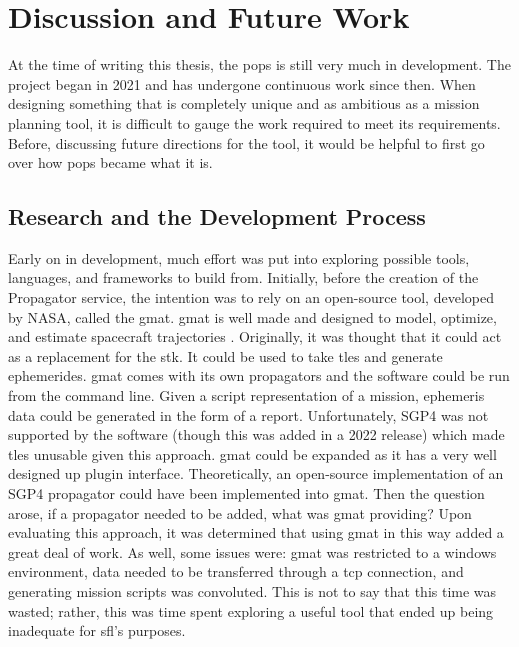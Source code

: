 \glsresetall{} 

\chapter{Discussion and Future Work}\label{chap:discussion}

\lettrine[lines=2, findent=0pt, nindent=5pt]{A}{}t the time of writing this
thesis, the \gls{pops} is still very much in development. The project began in
2021 and has undergone continuous work since then. When designing something that
is completely unique and as ambitious as a mission planning tool, it is
difficult to gauge the work required to meet its requirements. Before,
discussing future directions for the tool, it would be helpful to first go over
how \gls{pops} became what it is. 

\section{Research and the Development Process}

Early on in development, much effort was put into exploring possible tools,
languages, and frameworks to build from. Initially, before the creation of
the Propagator service, the intention was to rely on an open-source tool,
developed by NASA, called the \gls{gmat}. \gls{gmat} is well made and designed
to model, optimize, and estimate spacecraft trajectories
\cite{hughes_using_2017}.  Originally, it was thought that it could act as a
replacement for the \gls{stk}. It could be used to take \glspl{tle} and
generate ephemerides.  \gls{gmat} comes with its own propagators and the
software could be run from the command line. Given a script representation of a
mission, ephemeris data could be generated in the form of a report.
Unfortunately, SGP4 was not supported by the software (though this was added in
a 2022 release) which made \glspl{tle} unusable given this approach.
\gls{gmat} could be expanded as it has a very well designed up plugin interface.
Theoretically, an open-source implementation of an SGP4 propagator could have
been implemented into \gls{gmat}.  Then the question arose, if a propagator
needed to be added, what was \gls{gmat} providing?  Upon evaluating this
approach, it was determined that using \gls{gmat} in this way added a great
deal of work. As well, some issues were: \gls{gmat} was restricted to a windows
environment, data needed to be transferred through a \gls{tcp} connection, and
generating mission scripts was convoluted. This is not to say that this time
was wasted; rather, this was time spent exploring a useful tool that ended up
being inadequate for \gls{sfl}'s purposes. 


